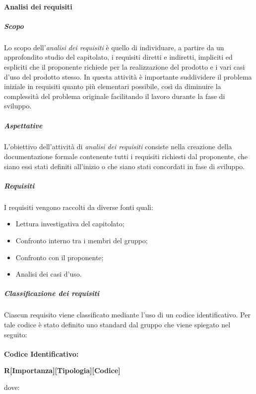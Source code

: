         \paragraph{Analisi dei requisiti} \label{paragraph:Analisi dei requisiti}
            \subparagraph{Scopo}
            Lo scopo dell’\textit{analisi dei requisiti} è quello di individuare, a partire da un approfondito studio del capitolato, i requisiti diretti e indiretti,
            impliciti ed espliciti che il proponente richiede per la realizzazione del prodotto e i vari casi d'uso del prodotto stesso. In questa attività è importante
            suddividere il problema iniziale in requisiti quanto più elementari possibile, così da diminuire la complessità del problema originale
             facilitando il lavoro durante la fase di sviluppo.

            \subparagraph{Aspettative} \label{subparagraph:ADR_Aspettative}
            L’obiettivo dell’attività di \textit{analisi dei requisiti} consiste nella creazione della documentazione formale contenente tutti i requisiti 
            richiesti dal proponente, che siano essi stati definiti all'inizio o che siano stati concordati in fase di sviluppo.

            \subparagraph{Requisiti} \label{subparagraph:Requisiti}
            I requisiti vengono raccolti da diverse fonti quali:
            \begin{itemize}
               \item Lettura investigativa del capitolato;
                \item Confronto interno tra i membri del gruppo;
                \item Confronto con il proponente;
                \item Analisi dei casi d'uso.
            \end{itemize}

            \subparagraph{Classificazione dei requisiti} \label{subparagraph:Classificazione dei requisiti}
            Ciascun requisito viene classificato mediante l'uso di un codice identificativo. Per tale codice è stato definito uno standard dal gruppo che viene spiegato nel seguito:\\\\
            \textbf{Codice Identificativo:}\\
            \begin{center}
                \textbf{\Large{R[Importanza][Tipologia][Codice]}}
            \end{center}
            dove:\\


